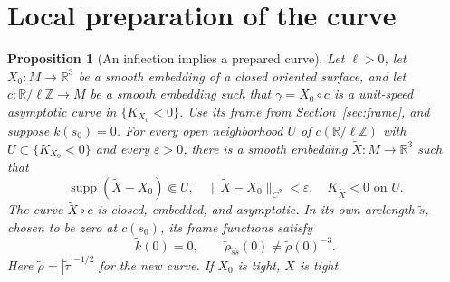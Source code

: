 \documentclass[11pt]{amsart}
\newtheorem{proposition}[theorem]{Proposition}
\theoremstyle{definition}
\newcommand{\R}{\mathbb R}
\DeclareMathOperator{\supp}{supp}
\begin{document}
\section{Local preparation of the curve}\label{sec:preparation}

\begin{proposition}[An inflection implies a prepared curve]
\label{prop:prepare}
Let $\ell>0$, let $X_0:M\to\R^3$ be a smooth embedding of a closed
oriented surface, and let $c:\R/\ell\mathbb Z\to M$ be a smooth embedding
such that $\gamma=X_0\circ c$ is a unit-speed asymptotic curve
in $\{K_{X_0}<0\}$. Use its frame from
Section~\ref{sec:frame}, and suppose $k(s_0)=0$.
For every open neighborhood $U$ of $c(\R/\ell\mathbb Z)$ with
$U\subset\{K_{X_0}<0\}$ and every $\varepsilon>0$, there is a
smooth embedding $\widetilde X:M\to\R^3$ such that
\[
 \supp(\widetilde X-X_0)\Subset U,\quad
 \|\widetilde X-X_0\|_{C^2}<\varepsilon,\quad
 K_{\widetilde X}<0\text{ on }U.
\]
The curve $\widetilde X\circ c$ is closed, embedded, and
asymptotic. In its own arclength $\widetilde s$, chosen to be zero at
$c(s_0)$, its frame functions satisfy
\begin{equation}\label{eq:prepared}
 \widetilde k(0)=0,\qquad
 \widetilde\rho_{\widetilde s\widetilde s}(0)\ne\widetilde\rho(0)^{-3}.
\end{equation}
Here $\widetilde\rho=|\widetilde\tau|^{-1/2}$ for the new curve.
If $X_0$ is tight, $\widetilde X$ is tight.
\end{proposition}
\end{document}
